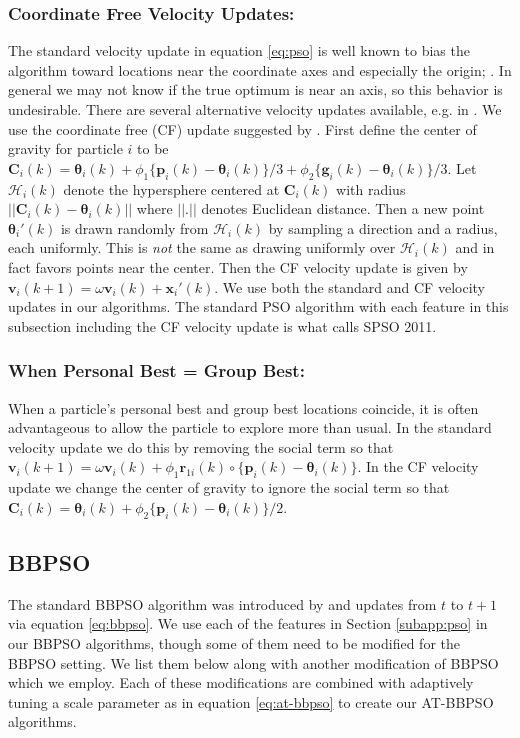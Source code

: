 \documentclass[cmbright]{staauth}
\begin{document}
\subsubsection{Coordinate Free Velocity Updates:}
The standard velocity update in equation \eqref{eq:pso} is well known to bias the algorithm toward locations near the coordinate axes and especially the origin; \cite{monson2005exposing,spears2010biases}. In general we may not know if the true optimum is near an axis, so this behavior is undesirable. There are several alternative velocity updates available, e.g. in \cite{monson2005exposing}. We use the coordinate free (CF) update suggested by \cite{clerc2011spso}. First define the center of gravity for particle $i$ to be $\bm{C}_i(k) = \bm{\theta}_i(k) + \phi_1\{\bm{p}_i(k) - \bm{\theta}_i(k)\}/3 + \phi_2\{\bm{g}_i(k) - \bm{\theta}_i(k)\}/3$. Let $\mathcal{H}_i(k)$ denote the hypersphere centered at $\bm{C}_i(k)$ with radius $||\bm{C}_i(k) - \bm{\theta}_i(k)||$ where $||.||$ denotes Euclidean distance. Then a new point $\bm{\theta}_i'(k)$ is drawn randomly from $\mathcal{H}_i(k)$ by sampling a direction and a radius, each uniformly. This is \emph{not} the same as drawing uniformly over $\mathcal{H}_i(k)$ and in fact favors points near the center. Then the CF velocity update is given by $\bm{v}_i(k+1) = \omega \bm{v}_i(k) + \bm{x}_i'(k)$. We use both the standard and CF velocity updates in our algorithms. The standard PSO algorithm with each feature in this subsection including the CF velocity update is what \cite{clerc2011spso} calls SPSO 2011.

\subsubsection{When Personal Best = Group Best:}
When a particle's personal best and group best locations coincide, it is often advantageous to allow the particle to explore more than usual. In the standard velocity update we do this by removing the social term so that $\bm{v}_i(k+1) = \omega \bm{v}_i(k) + \phi_1 \bm{r}_{1i}(k)\circ\{\bm{p}_i(k) - \bm{\theta}_i(k)\}$. In the CF velocity update we change the center of gravity to ignore the social term so that $\bm{C}_i(k) = \bm{\theta}_i(k) + \phi_2\{\bm{p}_i(k) - \bm{\theta}_i(k)\}/2$.

\subsection{BBPSO}\label{subapp:bbpso}
The standard BBPSO algorithm was introduced by \cite{kennedy2003bare} and updates from $t$ to $t+1$ via equation \eqref{eq:bbpso}. We use each of the features in Section \ref{subapp:pso} in our BBPSO algorithms, though some of them need to be modified for the BBPSO setting. We list them below along with another modification of BBPSO which we employ. Each of these modifications are combined with adaptively tuning a scale parameter as in equation \eqref{eq:at-bbpso} to create our AT-BBPSO algorithms.
\end{document}
